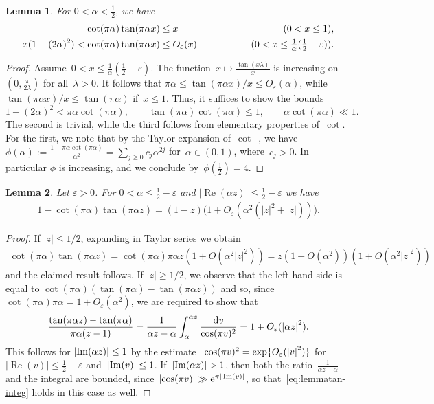 \documentclass[11pt]{amsart}
\newcommand{\eps}{\varepsilon}
\newcommand{\ee}{\varepsilon}
\newtheorem{lemma}{Lemma}
\theoremstyle{definition}
\newcommand{\pr}[1]{\mathchoice{\left( #1\right)}{(#1)}{(#1)}{(#1)}}
\newcommand{\e}[1][]{\ifthenelse{\equal{#1}{}}{{\rm e}}{\operatorname{e}\pr{ #1}}}
\newcommand{\df}{\mathrm{d}}
\renewcommand\Re{\operatorname{Re}}
\renewcommand\Im{\operatorname{Im}}
\newcommand{\1}{{\mathbf 1}}
\newcommand{\abs}[1]{\left|#1\right|}
\let\originalleft\left
\let\originalright\right
\renewcommand{\left}{\mathopen{}\mathclose\bgroup\originalleft}
\renewcommand{\right}{\aftergroup\egroup\originalright}
\numberwithin{equation}{section}
\begin{document}
\begin{lemma}\label{tan_ineq}
  For $0<\alpha<\frac12$, we have
  \begin{align}
    \cot(\pi\alpha) \tan(\pi\alpha x) & {} \leq x & \hspace{8em} (0<x\leq 1), \label{eq:tanineq-1} \\
    x(1-(2\alpha)^2)< \cot(\pi\alpha) \tan(\pi\alpha x) &{} \leq O_\ee(x) &\hfill (0<x\leq \tfrac1\alpha(\tfrac12-\eps)). \label{eq:tanineq-2}
  \end{align}
\end{lemma}
\begin{proof}
  Assume~$0<x \leq \frac1\alpha(\frac12-\eps)$. The function~$x\mapsto \frac{\tan(x\lambda)}{x}$ is increasing on~$(0, \frac{\pi}{2\lambda})$ for all~$\lambda>0$. It follows that $\pi\alpha\leq \tan(\pi\alpha x)/x \leq O_\ee(\alpha)$, while~$\tan(\pi\alpha x)/x \leq \tan(\pi\alpha)$ if~$x\leq 1$. Thus, it suffices to show the bounds
  $$ 1-(2\alpha)^2 < \pi \alpha \cot(\pi \alpha), \qquad \tan(\pi\alpha ) \cot(\pi \alpha)\leq 1, \qquad \alpha \cot(\pi \alpha) \ll 1. $$
  The second is trivial, while the third follows from elementary properties of~$\cot$. For the first, we note that by the Taylor expansion of~$\cot$~\cite[1.411.7]{GZ}, we have~$\phi(\alpha) := \frac{1-\pi\alpha \cot(\pi \alpha)}{\alpha^2} = \sum_{j\geq 0} c_j \alpha^{2j}$ for~$\alpha\in(0, 1)$, where~$c_j>0$. In particular $\phi$ is increasing, and we conclude by~$\phi(\frac12)=4$.
\end{proof}
\begin{lemma}\label{tan_ineq2}
  Let $\eps>0$. For $0<\alpha\leq \frac12-\eps$ and $|\Re(\alpha z)|\leq \frac12-\eps$ we have
  \begin{align*}
    1-\cot(\pi\alpha)\tan(\pi\alpha z)=(1-z)\big(1+O_\eps(\alpha^2(|z|^2+|z|))\big).
  \end{align*}
\end{lemma}
\begin{proof}
  If $|z|\leq 1/2$, expanding in Taylor series we obtain
  \begin{align*}
    \cot(\pi\alpha)\tan(\pi\alpha z)=    \cot(\pi\alpha)\pi\alpha z(1+O(\alpha^2|z|^2))= z(1+O(\alpha^2))(1+O(\alpha^2|z|^2))
  \end{align*}
  and the claimed result follows. If $|z|\geq1/2$, we observe that the left hand side is equal to $\cot(\pi\alpha)(\tan(\pi\alpha )-\tan(\pi\alpha z))$ and so, since $\cot(\pi\alpha)\pi\alpha=1+O_\eps(\alpha^2)$, we are required to show that
  \begin{equation}
  \frac{\tan(\pi \alpha z)-\tan(\pi \alpha)}{\pi \alpha(z-1)}
  = \frac1{\alpha z-\alpha}\int_\alpha^{\alpha z} \frac{\df v}{\cos(\pi v)^2} =  1 + O_\ee( \abs{\alpha z}^2).\label{eq:lemmatan-integ}
\end{equation}
  This follows for $\abs{\Im(\alpha z)}\leq 1$  by the estimate ~$\cos(\pi v)^2 = \exp\{O_\ee(\abs{v}^2)\}$ for $|\Re(v)|\leq\frac12-\eps$ and~$\abs{\Im(v)}\leq 1$. If~$\abs{\Im(\alpha z)}>1$, then both the ratio~$\frac1{\alpha z-\alpha}$ and the integral are bounded, since~$\abs{\cos(\pi v)} \gg \e^{\pi|\Im(v)|}$, so that~\eqref{eq:lemmatan-integ} holds in this case as well.
\end{proof}
\end{document}
